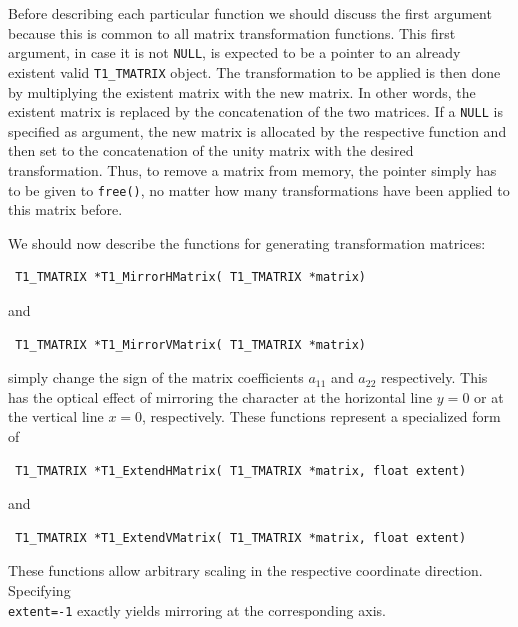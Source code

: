 Before describing each particular function we should discuss the first
argument because this is common to all matrix transformation functions. This
first argument, in case it is not \verb+NULL+, is expected to be a pointer to
an already existent valid \verb+T1_TMATRIX+ object. The transformation to be
applied is then done by multiplying the existent matrix with the new
matrix. In other words, the existent matrix is replaced by the concatenation of
the two matrices. If a \verb+NULL+ is specified as argument, the new matrix is
allocated by the respective function and then set to the concatenation of the
unity matrix with the desired transformation. Thus, to remove a matrix from
memory, the pointer simply has to be given to \verb+free()+, no matter how
many transformations have been applied to this matrix before.

We should now describe the functions for generating transformation matrices:
\precorr
\begin{verbatim}
 T1_TMATRIX *T1_MirrorHMatrix( T1_TMATRIX *matrix)
\end{verbatim}\postcorr
and
\precorr
\begin{verbatim}
 T1_TMATRIX *T1_MirrorVMatrix( T1_TMATRIX *matrix)
\end{verbatim}\postcorr
simply change the sign of the matrix coefficients $a_{11}$ and $a_{22}$
respectively. This has the optical effect of mirroring the character at the
horizontal line $y=0$ or at the vertical line $x=0$, respectively. These
functions represent a specialized form of 
\precorr
\begin{verbatim}
 T1_TMATRIX *T1_ExtendHMatrix( T1_TMATRIX *matrix, float extent)
\end{verbatim}\postcorr
and
\precorr
\begin{verbatim}
 T1_TMATRIX *T1_ExtendVMatrix( T1_TMATRIX *matrix, float extent)
\end{verbatim}\postcorr
These functions allow arbitrary scaling in the respective coordinate
direction. Specifying \\
\verb+extent=-1+ exactly yields mirroring at the
corresponding axis. 

